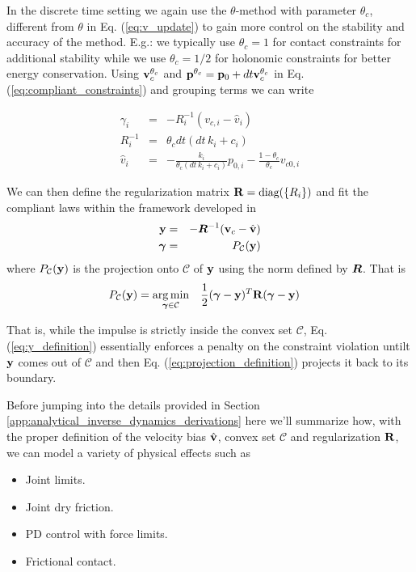 In the discrete time setting we again use the $\theta\text{-method}$ with
parameter $\theta_c$, different from $\theta$ in Eq.
(\ref{eq:v_update}) to gain more control on the stability and
accuracy of the method. E.g.: we typically use $\theta_c=1$ for contact
constraints for additional stability while we use $\theta_c=1/2$ for holonomic
constraints for better energy conservation. Using ${\mathbf{v}}_c^{\theta_c}$ and
${\mathbf{p}}^{\theta_c}={\mathbf{p}}_0+dt{\mathbf{v}}_c^{\theta_c}$ in Eq.
(\ref{eq:compliant_constraints}) and grouping terms we can write

\begin{eqnarray}
	\gamma_i &=& -R_i^{-1}(v_{c,i}-\hat{v}_i)\nonumber\\
	R_i^{-1} &=& \theta_c dt (dt\,k_i+c_i)\nonumber\\
	\hat{v}_i &=& -\frac{k_i}{\theta_c(dt\,k_i+c_i)}p_{0,i}-
	              \frac{1-\theta_c}{\theta_c}v_{c0,i}
\end{eqnarray}

We can then define the regularization matrix ${\mathbf{R}}=\text{diag}(\{R_i\})$ and
fit the compliant laws within the framework developed in \cite{bib:todorov2014}
\begin{eqnarray}
	\mf{y} &=& -\vf{R}^{-1}(\mf{v}_c-\hat{\mf{v}}) \label{eq:y_definition}\\
	\bgamma &=& P_\mathcal{C}(\mf{y})
	\label{eq:projection_definition}
\end{eqnarray}
where $P_\mathcal{C}({\mathbf{y}})$ is the projection onto $\mathcal{C}$ of ${\mathbf{y}}$
using the norm defined by ${\bm{R}}$. That is
\begin{equation}
	\begin{aligned}
		P_\mathcal{C}({\mathbf{y}})=\operatorname*{arg\,min}_{{\bm\gamma}\in\mathcal{C}} \quad & \frac{1}{2}({\bm\gamma}-{\mathbf{y}})^T{\mathbf{R}}({\bm\gamma}-{\mathbf{y}})
	\end{aligned}
\end{equation}

That is, while the impulse is strictly inside the convex set $\mathcal{C}$, Eq.
(\ref{eq:y_definition}) essentially enforces a penalty on the constraint
violation untilt ${\mathbf{y}}$ comes out of $\mathcal{C}$ and then Eq.
(\ref{eq:projection_definition}) projects it back to its boundary.

Before jumping into the details provided in Section
\ref{app:analytical_inverse_dynamics_derivations} here we'll summarize how, with
the proper definition of the velocity bias $\hat{{\mathbf{v}}}$, convex set
$\mathcal{C}$ and regularization ${\mathbf{R}}$, we can model a variety of physical
effects such as
\begin{itemize}
	\item Joint limits.
	\item Joint dry friction.
	\item PD control with force limits.
	\item Frictional contact.
\end{itemize}

